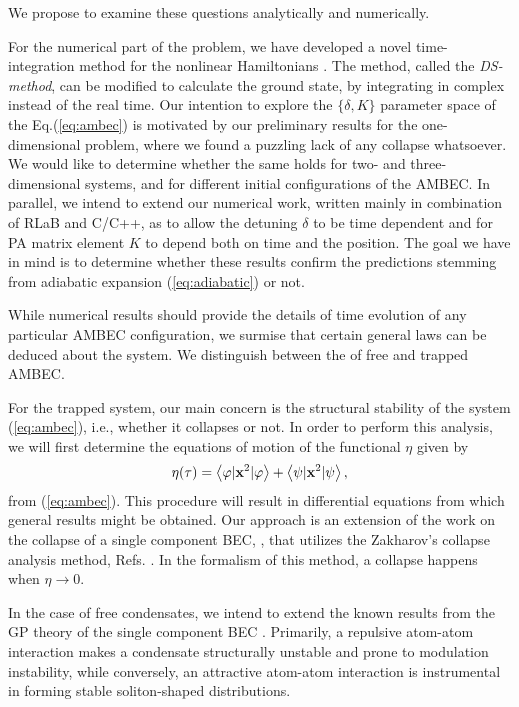 \documentclass[%
   final       %
]{prospectus}
\begin{document}
We propose to examine these questions analytically and numerically.

For the numerical part of the problem,  we have developed a novel
time-integration method for the nonlinear Hamiltonians \cite{Kostrun2001:DS}. 
The method, called the {\it DS-method},
can be modified to calculate the ground state, by integrating in 
complex instead of the real time. Our intention
to explore the $\{ \delta, K \}$ parameter space of
the Eq.(\ref{eq:ambec}) is motivated by our preliminary results for
the one-dimensional problem, where we found a puzzling lack of any collapse
whatsoever.
We would like to determine whether the same holds for
two- and three-dimensional systems, and for different initial configurations
of the AMBEC. 
In parallel, we intend to extend our numerical work, written mainly in
combination of RLaB and C/C++, as to allow the detuning $\delta$ to be time
dependent and for PA matrix element $K$ to depend both on time and the
position.
The goal we have in mind is to determine whether these results confirm
the predictions stemming from adiabatic expansion (\ref{eq:adiabatic}) 
or not.

While numerical results should provide the details of time evolution
of any particular AMBEC configuration, we surmise that certain general laws
can be deduced about the system. We distinguish between the of free and
trapped AMBEC.

For the trapped system, our main concern is the structural stability of
the system (\ref{eq:ambec}), i.e., whether it collapses or not. 
In order to perform this analysis, we will first determine
the equations of motion of the functional $\eta$ given by
\begin{equation}
  \label{eq:eta}
  \eta(\tau) = 
  \left< \varphi | {\bf x}^2 | \varphi \right> +
  \left< \psi    | {\bf x}^2 | \psi  \right>,
\end{equation}
from (\ref{eq:ambec}). This procedure will result in 
differential equations from which general results might be
obtained. 
Our approach is an extension of the work on the collapse of a single component
BEC, \cite{Wadatietal1998}, that utilizes the Zakharov's collapse analysis
method, Refs. \cite{Zakharov1972,Zakharovetal1975}.
In the formalism of this method, a collapse happens when
$\eta \rightarrow 0$.

In the case of free condensates, we intend to extend the known results
from the GP theory of the single component BEC \cite{Drummondetal1998}.
Primarily, a repulsive atom-atom interaction makes a condensate structurally
unstable and prone to modulation instability, while conversely, an
attractive atom-atom interaction is instrumental in forming stable
soliton-shaped distributions.
\end{document}

